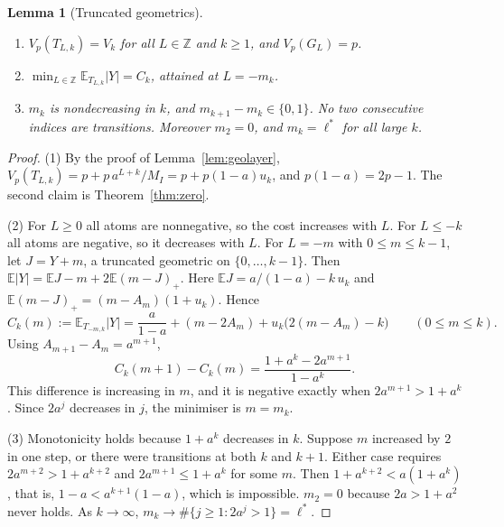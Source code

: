 \documentclass{article}
\newtheorem{lemma}[theorem]{Lemma}
\theoremstyle{definition}
\theoremstyle{remark}
\newcommand{\Z}{\mathbb{Z}}
\newcommand{\E}{\mathbb{E}}
\begin{document}
\begin{lemma}[Truncated geometrics]\label{lem:T}
\begin{enumerate}
\item \(V_p(T_{L,k})=V_k\) for all \(L\in\Z\) and \(k\ge1\), and \(V_p(G_L)=p\).
\item \(\min_{L\in\Z}\E_{T_{L,k}}|Y|=C_k\), attained at \(L=-m_k\).
\item \(m_k\) is nondecreasing in \(k\), and \(m_{k+1}-m_k\in\{0,1\}\). No two consecutive indices are transitions. Moreover \(m_2=0\), and \(m_k=\ell^*\) for all large \(k\).
\end{enumerate}
\end{lemma}
\begin{proof}
(1) By the proof of Lemma~\ref{lem:geolayer}, \(V_p(T_{L,k})=p+p\,a^{L+k}/M_I=p+p(1-a)u_k\), and \(p(1-a)=2p-1\). The second claim is Theorem~\ref{thm:zero}.

(2) For \(L\ge0\) all atoms are nonnegative, so the cost increases with \(L\). For \(L\le-k\) all atoms are negative, so it decreases with \(L\). For \(L=-m\) with \(0\le m\le k-1\), let \(J=Y+m\), a truncated geometric on \(\{0,\dots,k-1\}\). Then \(\E|Y|=\E J-m+2\E(m-J)_+\). Here \(\E J=a/(1-a)-k\,u_k\) and \(\E(m-J)_+=(m-A_m)(1+u_k)\). Hence
\[
C_k(m):=\E_{T_{-m,k}}|Y|=\frac{a}{1-a}+(m-2A_m)+u_k\bigl(2(m-A_m)-k\bigr)\qquad(0\le m\le k).
\]
Using \(A_{m+1}-A_m=a^{m+1}\),
\begin{equation}\label{eq:shift}
C_k(m+1)-C_k(m)=\frac{1+a^k-2a^{m+1}}{1-a^k}.
\end{equation}
This difference is increasing in \(m\), and it is negative exactly when \(2a^{m+1}>1+a^k\). Since \(2a^j\) decreases in \(j\), the minimiser is \(m=m_k\).

(3) Monotonicity holds because \(1+a^k\) decreases in \(k\). Suppose \(m\) increased by \(2\) in one step, or there were transitions at both \(k\) and \(k+1\). Either case requires \(2a^{m+2}>1+a^{k+2}\) and \(2a^{m+1}\le1+a^{k}\) for some \(m\). Then \(1+a^{k+2}<a(1+a^k)\), that is, \(1-a<a^{k+1}(1-a)\), which is impossible. \(m_2=0\) because \(2a>1+a^2\) never holds. As \(k\to\infty\), \(m_k\to\#\{j\ge1:2a^j>1\}=\ell^*\).
\end{proof}
\end{document}
